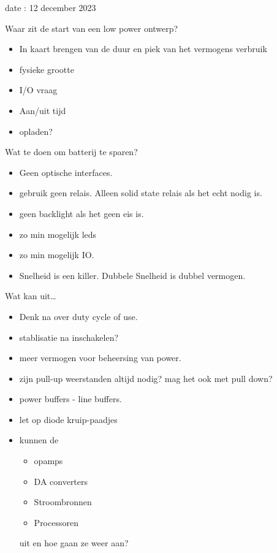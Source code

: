 date : 12 december 2023

Waar zit de start van een low power ontwerp?
\begin{itemize}
    \item In kaart brengen van de duur en piek van het vermogens verbruik
    \item fysieke grootte
    \item I/O vraag
    \item Aan/uit tijd
    \item opladen?
\end{itemize}

\vspace{0.5cm}
Wat te doen om batterij te sparen?
\begin{itemize}
    \item Geen optische interfaces.
    \item gebruik geen relais. Alleen solid state relais als het echt nodig is.
    \item geen backlight als het geen eis is.
    \item zo min mogelijk leds
    \item zo min mogelijk IO.
    \item Snelheid is een killer. Dubbele Snelheid is dubbel vermogen.
\end{itemize}

\vspace{0.5cm}
Wat kan uit\dots
\begin{itemize}
    \item Denk na over duty cycle of use.
    \item stablisatie na inschakelen?
    \item meer vermogen voor beheersing van power.
    \item zijn pull-up weerstanden altijd nodig? mag het ook met pull down?
    \item power buffers - line buffers.
    \item let op diode kruip-paadjes
    \item kunnen de
    \begin{itemize}
        \item opamps
        \item DA converters
        \item Stroombronnen
        \item Processoren
    \end{itemize}
    uit en hoe gaan ze weer aan?
\end{itemize}

